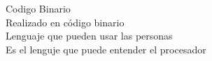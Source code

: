 \documentclass[preview]{standalone}
\begin{document}
Codigo Binario\\Realizado en código binario\\Lenguaje que pueden usar las personas\\Es el lenguje que puede entender el procesador\\
\end{document}
